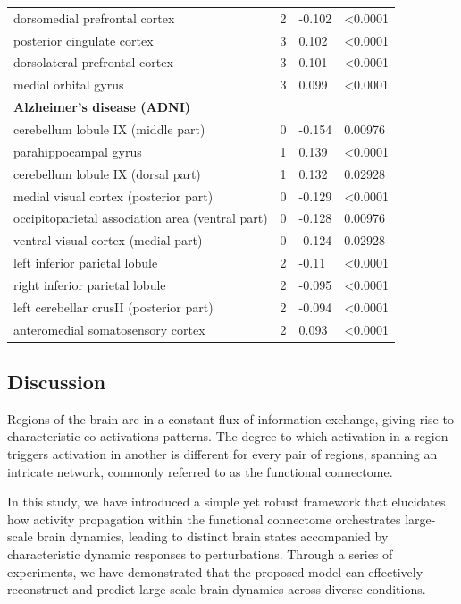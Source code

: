 \documentclass{article}
\begin{document}
\begin{table}
\begin{tabular}{p{}p{}p{}p{}}
dorsomedial prefrontal cortex & 2 & -0.102 & \textless 0.0001 \\
posterior cingulate cortex & 3 & 0.102 & \textless 0.0001 \\
dorsolateral prefrontal cortex & 3 & 0.101 & \textless 0.0001 \\
medial orbital gyrus & 3 & 0.099 & \textless 0.0001 \\
\textbf{Alzheimer's disease (ADNI)} &  &  &  \\
cerebellum lobule IX (middle part) & 0 & -0.154 & 0.00976 \\
parahippocampal gyrus & 1 & 0.139 & \textless 0.0001 \\
cerebellum lobule IX (dorsal part) & 1 & 0.132 & 0.02928 \\
medial visual cortex (posterior part) & 0 & -0.129 & \textless 0.0001 \\
occipitoparietal association area (ventral part) & 0 & -0.128 & 0.00976 \\
ventral visual cortex (medial part) & 0 & -0.124 & 0.02928 \\
left inferior parietal lobule & 2 & -0.11 & \textless 0.0001 \\
right inferior parietal lobule & 2 & -0.095 & \textless 0.0001 \\
left cerebellar crusII (posterior part) & 2 & -0.094 & \textless 0.0001 \\
anteromedial somatosensory cortex & 2 & 0.093 & \textless 0.0001 \\
\bottomrule
\end{tabular}
\end{table}

\subsection{Discussion}\label{Discussion}

Regions of the brain are in a constant flux of information exchange, giving rise to characteristic co-activations patterns.
The degree to which activation in a region triggers activation in another is different for every pair of regions, spanning an
intricate network, commonly referred to as the functional connectome.

In this study, we have introduced a simple yet robust framework that elucidates how activity propagation within the functional connectome orchestrates large-scale brain dynamics, leading to distinct brain states accompanied by characteristic dynamic responses to perturbations.
Through a series of experiments, we have demonstrated that the proposed model can effectively reconstruct and predict large-scale brain dynamics across diverse conditions.
\end{document}
